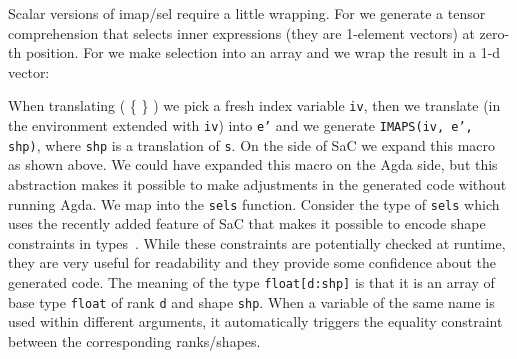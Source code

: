 {Scalar versions of imap/sel require a little wrapping.  For  we
generate a tensor comprehension that selects inner expressions (they are
1-element vectors) at zero-th position.  For  we make selection into
an array and we wrap the result in a 1-d vector:
When translating ( \{  \} ) we pick a fresh index variable
\texttt{iv}, then we translate \AB{e} (in the environment extended with \texttt{iv})
into \texttt{e'} and we generate \texttt{IMAPS(iv, e', shp)}, where \texttt{shp} is
a translation of \texttt{s}.  On the side of SaC we expand this macro as shown
above.  We could have expanded this macro on the Agda side, but this abstraction
makes it possible to make adjustments in the generated code without running Agda.
We map \AC{selₛ} into the \texttt{sels} function.  Consider the type of \texttt{sels}
which uses the recently added feature of SaC that makes it possible to encode
shape constraints in types~\cite{type-pattern}.  While these constraints are potentially checked at runtime,
they are very useful for readability and they provide some confidence about the
generated code.  The meaning of the type \texttt{float[d:shp]} is that it is
an array of base type \texttt{float} of rank \texttt{d} and shape \texttt{shp}.
When a variable of the same name is used within different arguments, it automatically
triggers the equality constraint between the corresponding ranks/shapes.

}
